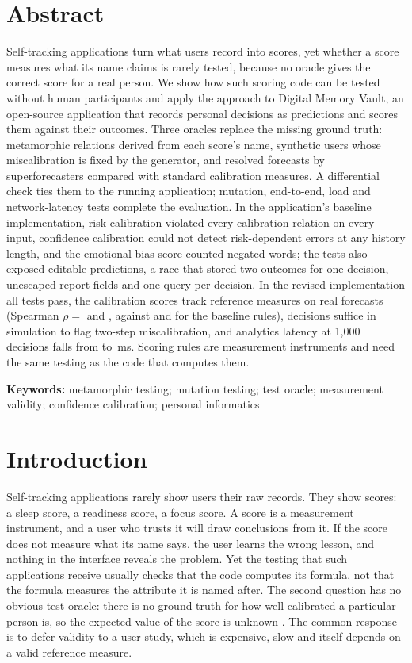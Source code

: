 \documentclass[12pt,a4paper]{article}
\begin{document}
\section*{Abstract}
Self-tracking applications turn what users record into scores, yet whether a score measures what its name claims is rarely tested, because no oracle gives the correct score for a real person. We show how such scoring code can be tested without human participants and apply the approach to Digital Memory Vault, an open-source application that records personal decisions as predictions and scores them against their outcomes. Three oracles replace the missing ground truth: metamorphic relations derived from each score's name, synthetic users whose miscalibration is fixed by the generator, and \ReplayForecasts{} resolved forecasts by \ReplayForecasters{} superforecasters compared with standard calibration measures. A differential check ties them to the running application; mutation, end-to-end, load and network-latency tests complete the evaluation. In the application's baseline implementation, risk calibration violated every calibration relation on every input, confidence calibration could not detect risk-dependent errors at any history length, and the emotional-bias score counted negated words; the tests also exposed editable predictions, a race that stored two outcomes for one decision, unescaped report fields and one query per decision. In the revised implementation all tests pass, the calibration scores track reference measures on real forecasts (Spearman $\rho=$ \RhoB{} and \RhoG{}, against \RhoA{} and \RhoF{} for the baseline rules), \MinimumHistory{} decisions suffice in simulation to flag two-step miscalibration, and analytics latency at 1,000 decisions falls from \BaseAnalyticsOneZeroZeroZeroMedian{} to \RevAnalyticsOneZeroZeroZeroMedian{}\,ms. Scoring rules are measurement instruments and need the same testing as the code that computes them.

\medskip\noindent\textbf{Keywords:} metamorphic testing; mutation testing; test oracle; measurement validity; confidence calibration; personal informatics

\section{Introduction}\label{sec:intro}

Self-tracking applications rarely show users their raw records. They show scores: a sleep score, a readiness score, a focus score. A score is a measurement instrument, and a user who trusts it will draw conclusions from it. If the score does not measure what its name says, the user learns the wrong lesson, and nothing in the interface reveals the problem. Yet the testing that such applications receive usually checks that the code computes its formula, not that the formula measures the attribute it is named after. The second question has no obvious test oracle: there is no ground truth for how well calibrated a particular person is, so the expected value of the score is unknown \cite{barr2015}. The common response is to defer validity to a user study, which is expensive, slow and itself depends on a valid reference measure.
\end{document}
